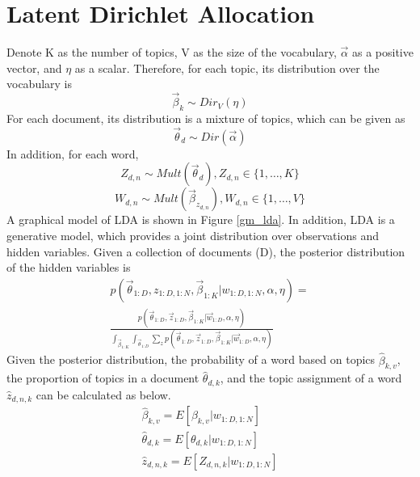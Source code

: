 \documentclass[conference]{IEEEtran}
\begin{document}
\section{Latent Dirichlet Allocation}

Denote K as the number of topics, V as the size of the vocabulary, $\overrightarrow{\alpha}$ as a positive vector, and $\eta$ as a scalar. Therefore, for each topic, its distribution over the vocabulary is
\begin{equation}
\overrightarrow{\beta}_k \sim Dir_V(\eta)
\end{equation}
For each document, its distribution is a mixture of topics, which can be given as
\begin{equation}
\overrightarrow{\theta}_d \sim Dir(\overrightarrow{\alpha})
\end{equation}
In addition, for each word, 
\begin{equation}
Z_{d,n} \sim Mult(\overrightarrow{\theta}_d), Z_{d,n} \in \{1,\ldots, K\}
\end{equation}
\begin{equation}
W_{d,n} \sim Mult(\overrightarrow{\beta}_{z_{d,n}}), W_{d,n} \in \{1,\ldots,V\} 
\end{equation}
A graphical model of LDA is shown in Figure \ref{gm_lda}. In addition, LDA is a generative model, which provides a joint distribution over observations and hidden variables. Given a collection of documents (D), the posterior distribution of the hidden variables is
\begin{equation}
\begin{split}
p(\overrightarrow{\theta}_{1:D},z_{1:D,1:N},\overrightarrow{\beta}_{1:K}|w_{1:D,1:N},\alpha,\eta)= \\[10pt]
\frac{p(\overrightarrow{\theta}_{1:D},\overrightarrow{z}_{1:D},\overrightarrow{\beta}_{1:K}|\overrightarrow{w}_{1:D},\alpha,\eta)}{\int_{\overrightarrow{\beta}_{1:K}}\int_{\overrightarrow{\theta}_{1:D}}\sum_{z}{p(\overrightarrow{\theta}_{1:D},\overrightarrow{z}_{1:D},\overrightarrow{\beta}_{1:K}|\overrightarrow{w}_{1:D},\alpha,\eta)}}
\end{split}
\end{equation} 
Given the posterior distribution, the probability of a word based on topics $\hat{\beta}_{k,v}$, the proportion of topics in a document $\hat{\theta}_{d,k}$, and the topic assignment of a word $\hat{z}_{d,n,k}$  can be calculated as below.
\begin{equation}
\begin{split}
\hat{\beta}_{k,v} = E[\beta_{k,v}|w_{1:D,1:N}]\\
\hat{\theta}_{d,k} = E[\theta_{d,k}|w_{1:D,1:N}]\\
\hat{z}_{d,n,k} = E[Z_{d,n,k}|w_{1:D,1:N}]
\end{split}
\end{equation}
\end{document}
